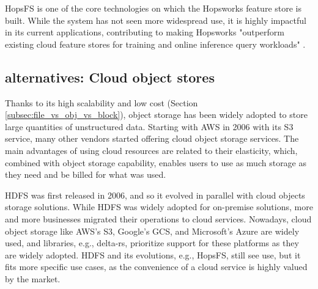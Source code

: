 \gls{HopsFS} is one of the core technologies on which the Hopsworks feature store is built. While the system has not seen more widespread use, it is highly impactful in its current applications, contributing to making Hopsworks "outperform existing cloud feature stores for training and online inference query workloads" \cite{10.1145/3626246.3653389}. 

\subsection{ alternatives: Cloud object stores}

Thanks to its high scalability and low cost (Section \ref{subsec:file_vs_obj_vs_block}), object storage has been widely adopted to store large quantities of unstructured data. Starting with \gls{AWS} in 2006 with its S3 service, many other vendors started offering cloud object storage services. The main advantages of using cloud resources are related to their elasticity, which, combined with object storage capability, enables users to use as much storage as they need and be billed for what was used. 

\gls{HDFS} was first released in 2006, and so it evolved in parallel with cloud objects storage solutions. While \gls{HDFS} was widely adopted for on-premise solutions, more and more businesses migrated their operations to cloud services. Nowadays, cloud object storage like \gls{AWS}'s S3, Google's \gls{GCS}, and Microsoft's Azure are widely used, and libraries, e.g., delta-rs, prioritize support for these platforms as they are widely adopted. \gls{HDFS} and its evolutions, e.g., \gls{HopsFS}, still see use, but it fits more specific use cases, as the convenience of a cloud service is highly valued by the market.